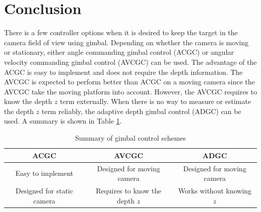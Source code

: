 \section{Conclusion}
There is a few controller options when it is desired to keep the target in the camera field of view using gimbal. Depending on whether the camera is moving or stationary, either angle commanding gimbal control (ACGC) or angular velocity commanding gimbal control (AVCGC) can be used. The advantage of the ACGC is easy to implement and does not require the depth information. The AVCGC is expected to perform better than ACGC on a moving camera since the AVCGC take the moving platform into account. However, the AVCGC requires to know the depth $z$ term externally. When there is no way to measure or estimate the depth $z$ term reliably, the adaptive depth gimbal control (ADGC) can be used. A summary is shown in Table \ref{gimbal_summary}.
\begin{table}[htbp]
	\begin{tabular}{ |c|c|c| } 
		\hline
		ACGC & AVCGC & ADGC \\
		\hline
		Easy to implement & Designed for moving camera & Designed for moving camera \\ 
		Designed for static camera & Requires to know the depth $z$ & Works without knowing $z$ \\  
		\hline
	\end{tabular}
	\caption{Summary of gimbal control schemes}
	\label{gimbal_summary}
\end{table}